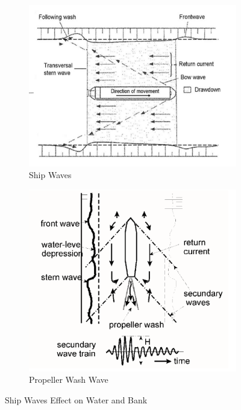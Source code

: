 \begin{figure}[H]
    \centering
    \begin{subfigure}{0.48\linewidth}
        \centering
        \includegraphics[width=\linewidth]{figures/ch2/shipwaves.png}
        \caption{Ship Waves}
        \label{fig:Ship Waves}
    \end{subfigure}
    \hfill
    \begin{subfigure}{0.48\linewidth}
        \centering
        \includegraphics[width=\linewidth]{figures/ch2/shipsecond.png}
        \caption{Propeller Wash Wave}
        \label{fig:Prop Wash Wave}
    \end{subfigure}
    \caption{Ship Waves Effect on Water and Bank}
    \label{Fig:Ship Waves Effect on Water and Bank}
\end{figure}

